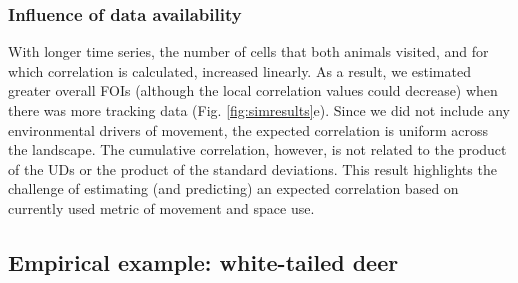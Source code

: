 \documentclass[letterpaper]{article}
\begin{document}
\subsubsection*{Influence of data availability}
With longer time series, the number of cells that both animals visited, and for which correlation is calculated, increased linearly. As a result, we estimated greater overall FOIs (although the local correlation values could decrease) when there was more tracking data (Fig. \ref{fig:simresults}e). 
Since we did not include any environmental drivers of movement, the expected correlation is uniform across the landscape. The cumulative correlation, however, is not related to the product of the UDs or the product of the standard deviations. This result highlights the challenge of estimating (and predicting) an expected correlation based on currently used metric of movement and space use.


\subsection*{Empirical example: white-tailed deer}
\end{document}
